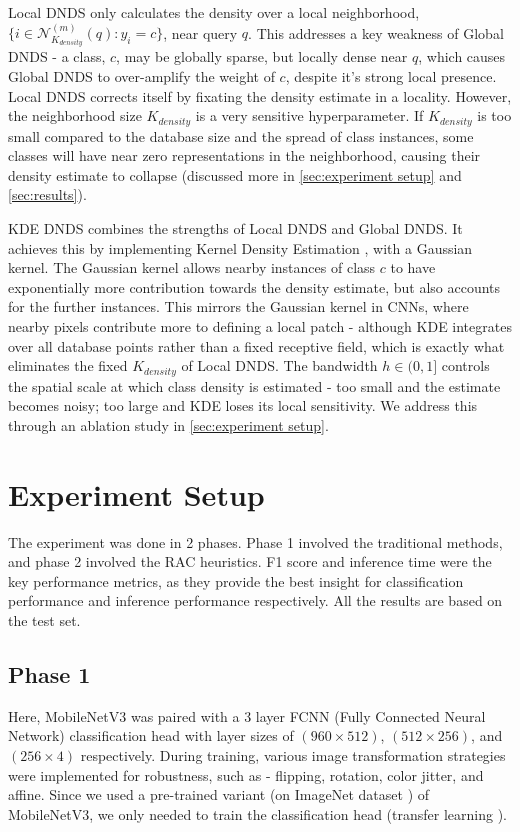 \documentclass{article}
\begin{document}
Local DNDS only calculates the density over a local neighborhood, $ \{ i \in \mathcal{N}_{K_{density}}^{(m)}(q) : y_i = c \} $, near query $q$. This addresses a key weakness of Global DNDS - a class, $c$, may be globally sparse, but locally dense near $q$, which causes Global DNDS to over-amplify the weight of $c$, despite it's strong local presence. Local DNDS corrects itself by fixating the density estimate in a locality. However, the neighborhood size $K_{density}$ is a very sensitive hyperparameter. If $K_{density}$ is too small compared to the database size and the spread of class instances, some classes will have near zero representations in the neighborhood, causing their density estimate to collapse (discussed more in \autoref{sec:experiment setup} and \autoref{sec:results}).

KDE DNDS combines the strengths of Local DNDS and Global DNDS. It achieves this by implementing Kernel Density Estimation \cite{wkeglarczyk2018kernel}, with a Gaussian kernel. The Gaussian kernel allows nearby instances of class $c$ to have exponentially more contribution towards the density estimate, but also accounts for the further instances. This mirrors the Gaussian kernel in CNNs, where nearby pixels contribute more to defining a local patch - although KDE integrates over all database points rather than a fixed receptive field, which is exactly what eliminates the fixed $K_{density}$ of Local DNDS. The bandwidth $h \in (0, 1]$ controls the spatial scale at which class density is estimated - too small and the estimate becomes noisy; too large and KDE loses its local sensitivity. We address this through an ablation study in \autoref{sec:experiment setup}.


\section{Experiment Setup}
\label{sec:experiment setup}

The experiment was done in 2 phases. Phase 1 involved the traditional methods, and phase 2 involved the RAC heuristics. F1 score and inference time were the key performance metrics, as they provide the best insight for classification performance and inference performance respectively. All the results are based on the test set.

\subsection{Phase 1}

Here, MobileNetV3 was paired with a 3 layer FCNN (Fully Connected Neural Network) classification head with layer sizes of $(960 \times 512)$, $(512 \times 256)$, and $(256 \times 4)$ respectively. During training, various image transformation strategies were implemented for robustness, such as - flipping, rotation, color jitter, and affine. Since we used a pre-trained variant (on ImageNet dataset \cite{deng2009imagenet}) of MobileNetV3, we only needed to train the classification head (transfer learning \cite{si2023apple}).
\end{document}
